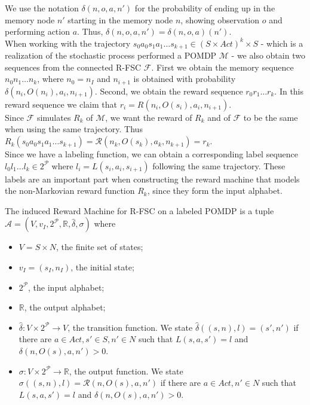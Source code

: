 We use the notation $\delta(n,o,a,n')$ for the probability of ending up in the memory node $n'$ starting in the memory node $n$, showing observation $o$ and performing action $a$. Thus, $\delta(n,o,a,n')=\delta(n,o,a)(n') $.\\

When working with the trajectory $s_0 a_0 s_1 a_1 \dots s_{k+1}\in(S\times Act)^k\times S$ - which is a realization of the stochastic process performed a POMDP $\mathcal{M}$ - we also obtain two sequences from the connected R-FSC $\mathcal{F}$. First we obtain the memory sequence $n_0 n_1 \dots n_k$, where $n_0=n_I$ and $n_{i+1}$ is obtained with probability $\delta(n_i,O(n_i),a_i,n_{i+1})$. Second, we obtain the reward sequence $r_0 r_1 \dots r_k$. In this reward sequence we claim that $r_i=R(n_i,O(s_i),a_i,n_{i+1})$. \\

Since $\mathcal{F}$ simulates $R_k$ of $\mathcal{M}$, we want the reward of $R_k$ and of $\mathcal{F}$ to be the same when using the same trajectory. Thus $R_k(s_0 a_0 s_1 a_1 \dots s_{k+1})= \mathcal{R}(n_{k},O(s_{k}),a_{k},n_{k+1})=r_k$.\\

Since we have a labeling function, we can obtain a corresponding label sequence $l_0 l_1 \dots l_k\in 2^{\mathcal{P}}$ where $l_i=L(s_i,a_i,s_{i+1})$ following the same trajectory. These labels are an important part when constructing the reward machine that models the non-Markovian reward function $R_k$, since they form the input alphabet. 

\begin{definition}
	The induced Reward Machine for R-FSC on a labeled POMDP is a tuple $\mathcal{A}=(V,v_I,2^{\mathcal{P}},\mathbb{R},\hat{\delta},\sigma)$ where 
	\begin{itemize}
		\item $V=S\times N$, the finite set of states;
		\item $v_I=(s_I,n_I)$, the initial state;
		\item $2^{\mathcal{P}}$, the input alphabet;
		\item $\mathbb{R}$, the output alphabet;
		\item $\hat{\delta}:V\times 2^{\mathcal{P}} \to V$, the transition function. We state $\hat{\delta}((s,n),l)=(s',n')$ if there are $a\in Act,s'\in S,n'\in N$ such that $L(s,a,s')=l$ and $\delta(n,O(s),a,n')>0$. 
	 \item $\sigma:V\times 2^{\mathcal{P}} \to \mathbb{R}$, the output function. We state
		$\sigma((s,n),l)=\mathcal{R}(n,O(s),a,n')$ if there are $a\in Act,n'\in N$ such that $L(s,a,s')=l$ and $\delta(n,O(s),a,n')>0$. 
	\end{itemize}
\end{definition}

